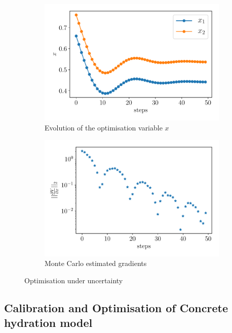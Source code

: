 \documentclass[a4paper,11pt]{article}
\begin{document}
\begin{figure}[!htpb]
\centering
\begin{subfigure}{0.45\textwidth}
    \includegraphics[width=\textwidth]{fig/optimised_x_17_08_2022_15:12.pdf}
    \caption{Evolution of the optimisation variable $x$}
    \label{fig:para_opt}
\end{subfigure}
\hfill
\begin{subfigure}{0.45\textwidth}
    \includegraphics[width=\textwidth]{fig/grad_optimisation_17_08_2022_15:12.pdf}
    \caption{Monte Carlo estimated gradients}
    \label{fig:grad_opt}
\end{subfigure}
\hfill
\caption{Optimisation under uncertainty}
\label{fig:opt_diagnostics}
\end{figure}

\subsection{Calibration and Optimisation of Concrete hydration model}
\end{document}
